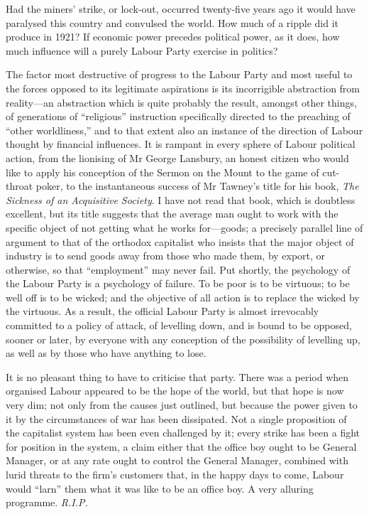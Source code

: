 \documentclass{book}
\begin{document}
Had the miners’ strike, or lock-out, occurred twenty-five years ago it would have paralysed this country and convulsed the world. How much of a ripple did it produce in 1921? If economic power precedes political power, as it does, how much influence will a purely Labour Party exercise in politics?

The factor most destructive of progress to the Labour Party and most useful to the forces opposed to its legitimate aspirations is its incorrigible abstraction from reality—an abstraction which is quite probably the result, amongst other things, of generations of “religious” instruction specifically directed to the preaching of “other worldliness,” and to that extent also an instance of the direction of Labour thought by financial influences. It is rampant in every sphere of Labour political action, from the lionising of Mr George Lansbury, an honest citizen who would like to apply his conception of the Sermon on the Mount to the game of cut-throat poker, to the instantaneous success of Mr Tawney’s title for his book, \emph{The Sickness of an Acquisitive Society}. I have not read that book, which is doubtless excellent, but its title suggests that the average man ought to work with the specific object of not getting what he works for—goods; a precisely parallel line of argument to that of the orthodox capitalist who insists that the major object of industry is to send goods away from those who made them, by export, or otherwise, so that “employment” may never fail. Put shortly, the psychology of the Labour Party is a psychology of failure. To be poor is to be virtuous; to be well off is to be wicked; and the objective of all action is to replace the wicked by the virtuous. As a result, the official Labour Party is almost irrevocably committed to a policy of attack, of levelling down, and is bound to be opposed, sooner or later, by everyone with any conception of the possibility of levelling up, as well as by those who have anything to lose.

It is no pleasant thing to have to criticise that party. There was a period when organised Labour appeared to be the hope of the world, but that hope is now very dim; not only from the causes just outlined, but because the power given to it by the circumstances of war has been dissipated. Not a single proposition of the capitalist system has been even challenged by it; every strike has been a fight for position in the system, a claim either that the office boy ought to be General Manager, or at any rate ought to control the General Manager, combined with lurid threats to the firm’s customers that, in the happy days to come, Labour would “larn” them what it was like to be an office boy. A very alluring programme. \emph{R.I.P.}
\end{document}

